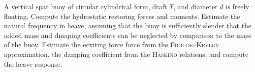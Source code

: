 A vertical spar buoy of circular cylindrical form, draft $T$, and diameter $d$ is freely floating.
Compute the hydrostatic restoring forces and moments.
Estimate the natural frequency in heave, assuming that the buoy is sufficiently slender that the added mass and dmaping coefficients can be neglected by comparison to the mass of the buoy.
Estimate the ecxiting force force from the \textsc{Froude}--\textsc{Krylov} approximation, the damping coefficient from the \textsc{Haskind} relations, and compute the heave response.